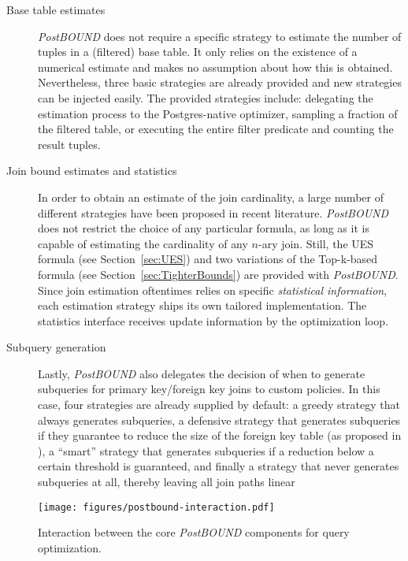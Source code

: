 \begin{description}
    \item[Base table estimates] \emph{PostBOUND} does not require a specific strategy to estimate the number of tuples in a (filtered) base table. It only relies on the existence of a numerical estimate and makes no assumption about how this is obtained. Nevertheless, three basic strategies are already provided and new strategies can be injected easily. The provided strategies include: delegating the estimation process to the Postgres-native optimizer, sampling a fraction of the filtered table, or executing the entire filter predicate and counting the result tuples.
    \item[Join bound estimates and statistics] In order to obtain an estimate of the join cardinality, a large number of different strategies have been proposed in recent literature. \emph{PostBOUND} does not restrict the choice of any particular formula, as long as it is capable of estimating the cardinality of any $n$-ary join. Still, the UES formula (see Section~\ref{sec:UES}) and two variations of the Top-k-based formula (see Section~\ref{sec:TighterBounds}) are provided with \emph{PostBOUND}. Since join estimation oftentimes relies on specific \emph{statistical information}, each estimation strategy ships its own tailored implementation. The statistics interface receives update information by the optimization loop.
    \item[Subquery generation] \label{item:postbound-subqueries} Lastly, \emph{PostBOUND} also delegates the decision of when to generate subqueries for primary key/foreign key joins to custom policies. In this case, four strategies are already supplied by default: a greedy strategy that always generates subqueries, a defensive strategy that generates subqueries if they guarantee to reduce the size of the foreign key table (as proposed in ), a ``smart'' strategy that generates subqueries if a reduction below a certain threshold is guaranteed, and finally a strategy that never generates subqueries at all, thereby leaving all join paths linear
\end{description}

\begin{figure}[tb]
	\centering
	\texttt{[image: figures/postbound-interaction.pdf]}
	\caption{Interaction between the core \emph{PostBOUND} components for query optimization.}
	\label{fig:postbound-interaction}
\end{figure}

